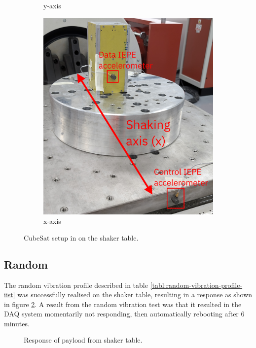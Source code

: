 \documentclass[]{report}
\begin{document}
\begin{figure}[H]
\begin{subfigure}{0.32\textwidth}
    \caption{y-axis}
  \end{subfigure}
  \begin{subfigure}{0.32\textwidth}
    \includegraphics[width=\linewidth]{images/x-axis-setup.jpg}
    \caption{x-axis}
  \end{subfigure}
  \caption{CubeSat setup in on the shaker table.}
  \label{fig:shaker-axis-setup}
\end{figure}



\subsection{Random}

The random vibration profile described in table \ref{tabl:random-vibration-profile-iist} was successfully realised on the shaker table, resulting in a response as shown in figure \ref{fig:random-table-resp}. A result from the random vibration test was that it resulted in the DAQ system momentarily not responding, then automatically rebooting after 6 minutes.

\begin{figure}[H]
  \centering
  
  \caption{Response of payload from shaker table.}
  \label{fig:random-table-resp}
\end{figure}
\end{document}
